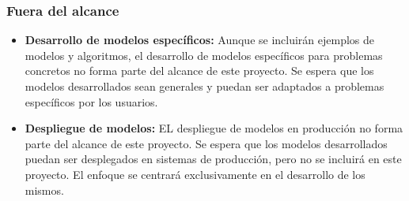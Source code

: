 \subsubsection{Fuera del alcance}
\begin{itemize}
    \item \textbf{Desarrollo de modelos específicos:} Aunque se incluirán ejemplos de
    modelos y algoritmos, el desarrollo de modelos específicos para problemas concretos
    no forma parte del alcance de este proyecto. Se espera que los modelos desarrollados
    sean generales y puedan ser adaptados a problemas específicos por los usuarios.
    \item \textbf{Despliegue de modelos:} EL despliegue de modelos en producción no forma
    parte del alcance de este proyecto. Se espera que los modelos desarrollados puedan ser
    desplegados en sistemas de producción, pero no se incluirá en este proyecto. El enfoque
    se centrará exclusivamente en el desarrollo de los mismos.
\end{itemize}

\pagebreak